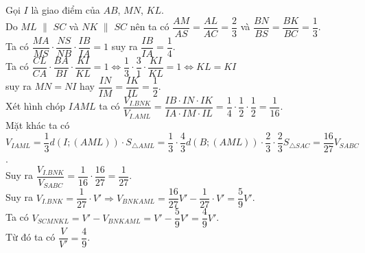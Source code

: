 \begin{ex}
{\begin{center}
		\end{center}
		Gọi $I$ là giao điểm của $AB$, $MN$, $KL$.\\
		Do $ML$ $\parallel$ $SC$ và $NK$ $\parallel$ $SC$ nên ta có $\dfrac{AM}{AS}=\dfrac{AL}{AC}=\dfrac{2}{3}$ và $\dfrac{BN}{BS}=\dfrac{BK}{BC}=\dfrac{1}{3}$.\\
		Ta có $\dfrac{MA}{MS}\cdot \dfrac{NS}{NB}\cdot \dfrac{IB}{IA}=1$ suy ra $\dfrac{IB}{IA}=\dfrac{1}{4}$.\\
		Ta có $\dfrac{CL}{CA}\cdot \dfrac{BA}{BI}\cdot \dfrac{KI}{KL}=1\Leftrightarrow \dfrac{1}{3}\cdot \dfrac{3}{1}\cdot \dfrac{KI}{KL}=1\Leftrightarrow KL=KI$\\
		suy ra $MN=NI$ hay $\dfrac{IN}{IM}=\dfrac{IK}{IL}=\dfrac{1}{2}$.\\
		Xét hình chóp $IAML$ ta có $\dfrac{V_{I.BNK}}{V_{I.AML}}=\dfrac{IB\cdot IN\cdot IK}{IA\cdot IM\cdot IL}=\dfrac{1}{4}\cdot \dfrac{1}{2}\cdot \dfrac{1}{2}=\dfrac{1}{16}$.\\
		Mặt khác ta có $V_{IAML}=\dfrac{1}{3}d(I;(AML))\cdot{S_{\triangle AML}}=\dfrac{1}{3}\cdot \dfrac{4}{3}d(B;(AML))\cdot \dfrac{2}{3}\cdot \dfrac{2}{3}S_{\triangle SAC}=\dfrac{16}{27}V_{SABC}$.\\
		Suy ra $\dfrac{V_{I.BNK}}{V_{SABC}}=\dfrac{1}{16}\cdot \dfrac{16}{27}=\dfrac{1}{27}$.\\
		Suy ra $V_{I.BNK}=\dfrac{1}{27}\cdot V'\Rightarrow {V_{BNKAML}}=\dfrac{16}{27}V'-\dfrac{1}{27}\cdot V'=\dfrac{5}{9}V'$.\\
		Ta có $V_{SCMNKL}=V'-V_{BNKAML}=V'-\dfrac{5}{9}V'=\dfrac{4}{9}V'$.\\
		Từ đó ta có $\dfrac{V}{V'}=\dfrac{4}{9}$.}
\end{ex}
